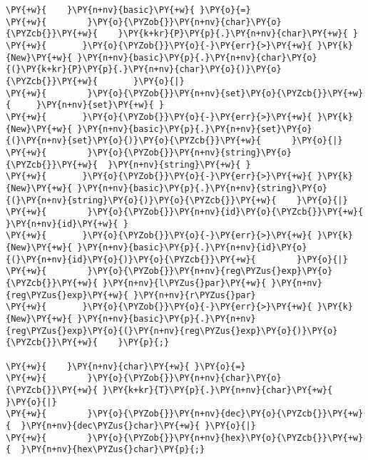 \begin{Verbatim}[commandchars=\\\{\}]
\PY{+w}{    }\PY{n+nv}{basic}\PY{+w}{ }\PY{o}{=}
\PY{+w}{        }\PY{o}{\PYZob{}}\PY{n+nv}{char}\PY{o}{\PYZcb{}}\PY{+w}{    }\PY{k+kr}{P}\PY{p}{.}\PY{n+nv}{char}\PY{+w}{ }
\PY{+w}{	   }\PY{o}{\PYZob{}}\PY{o}{-}\PY{err}{>}\PY{+w}{ }\PY{k}{New}\PY{+w}{ }\PY{n+nv}{basic}\PY{p}{.}\PY{n+nv}{char}\PY{o}{(}\PY{k+kr}{P}\PY{p}{.}\PY{n+nv}{char}\PY{o}{)}\PY{o}{\PYZcb{}}\PY{+w}{		}\PY{o}{|}
\PY{+w}{        }\PY{o}{\PYZob{}}\PY{n+nv}{set}\PY{o}{\PYZcb{}}\PY{+w}{     }\PY{n+nv}{set}\PY{+w}{ }
\PY{+w}{	   }\PY{o}{\PYZob{}}\PY{o}{-}\PY{err}{>}\PY{+w}{ }\PY{k}{New}\PY{+w}{ }\PY{n+nv}{basic}\PY{p}{.}\PY{n+nv}{set}\PY{o}{(}\PY{n+nv}{set}\PY{o}{)}\PY{o}{\PYZcb{}}\PY{+w}{		}\PY{o}{|}
\PY{+w}{        }\PY{o}{\PYZob{}}\PY{n+nv}{string}\PY{o}{\PYZcb{}}\PY{+w}{  }\PY{n+nv}{string}\PY{+w}{ }
\PY{+w}{	   }\PY{o}{\PYZob{}}\PY{o}{-}\PY{err}{>}\PY{+w}{ }\PY{k}{New}\PY{+w}{ }\PY{n+nv}{basic}\PY{p}{.}\PY{n+nv}{string}\PY{o}{(}\PY{n+nv}{string}\PY{o}{)}\PY{o}{\PYZcb{}}\PY{+w}{	}\PY{o}{|}
\PY{+w}{        }\PY{o}{\PYZob{}}\PY{n+nv}{id}\PY{o}{\PYZcb{}}\PY{+w}{      }\PY{n+nv}{id}\PY{+w}{ }
\PY{+w}{	   }\PY{o}{\PYZob{}}\PY{o}{-}\PY{err}{>}\PY{+w}{ }\PY{k}{New}\PY{+w}{ }\PY{n+nv}{basic}\PY{p}{.}\PY{n+nv}{id}\PY{o}{(}\PY{n+nv}{id}\PY{o}{)}\PY{o}{\PYZcb{}}\PY{+w}{		}\PY{o}{|}
\PY{+w}{        }\PY{o}{\PYZob{}}\PY{n+nv}{reg\PYZus{}exp}\PY{o}{\PYZcb{}}\PY{+w}{ }\PY{n+nv}{l\PYZus{}par}\PY{+w}{ }\PY{n+nv}{reg\PYZus{}exp}\PY{+w}{ }\PY{n+nv}{r\PYZus{}par}
\PY{+w}{	   }\PY{o}{\PYZob{}}\PY{o}{-}\PY{err}{>}\PY{+w}{ }\PY{k}{New}\PY{+w}{ }\PY{n+nv}{basic}\PY{p}{.}\PY{n+nv}{reg\PYZus{}exp}\PY{o}{(}\PY{n+nv}{reg\PYZus{}exp}\PY{o}{)}\PY{o}{\PYZcb{}}\PY{+w}{	}\PY{p}{;}

\PY{+w}{    }\PY{n+nv}{char}\PY{+w}{ }\PY{o}{=}
\PY{+w}{        }\PY{o}{\PYZob{}}\PY{n+nv}{char}\PY{o}{\PYZcb{}}\PY{+w}{ }\PY{k+kr}{T}\PY{p}{.}\PY{n+nv}{char}\PY{+w}{ }\PY{o}{|}
\PY{+w}{        }\PY{o}{\PYZob{}}\PY{n+nv}{dec}\PY{o}{\PYZcb{}}\PY{+w}{  }\PY{n+nv}{dec\PYZus{}char}\PY{+w}{ }\PY{o}{|}
\PY{+w}{        }\PY{o}{\PYZob{}}\PY{n+nv}{hex}\PY{o}{\PYZcb{}}\PY{+w}{  }\PY{n+nv}{hex\PYZus{}char}\PY{p}{;}


\end{Verbatim}
